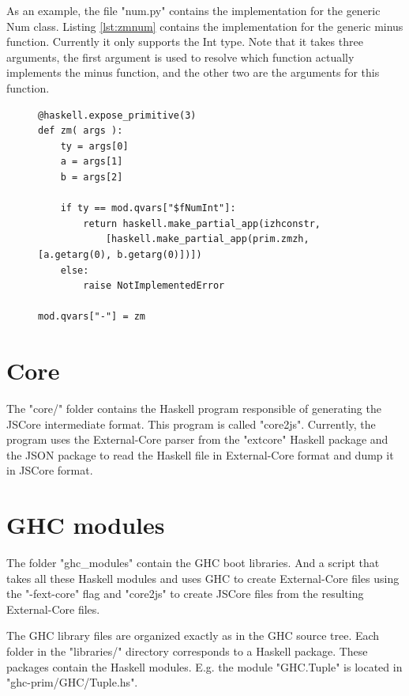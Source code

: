 As an example, the file "num.py" contains the implementation for the generic
Num class. Listing \ref{lst:zmnum} contains the implementation for the
generic minus function. Currently it only supports the Int type. Note that
it takes three arguments, the first argument is used to resolve which 
function actually implements the minus function, and the other two are the
arguments for this function.

\begin{figure}[H]
\lstset{ %
language=Python,
caption=Python class implementing the Haskell Int Value.,
label=lst:zmnum
}
\begin{lstlisting}
@haskell.expose_primitive(3)
def zm( args ):
    ty = args[0]
    a = args[1]
    b = args[2]

    if ty == mod.qvars["$fNumInt"]:
        return haskell.make_partial_app(izhconstr,
            [haskell.make_partial_app(prim.zmzh, [a.getarg(0), b.getarg(0)])])
    else:
        raise NotImplementedError

mod.qvars["-"] = zm
\end{lstlisting}
\end{figure}



\section{Core}

The "core/" folder contains the Haskell program responsible of generating the
JSCore intermediate format. This program is called "core2js". Currently, the
program uses the External-Core parser from the "extcore" Haskell package and
the JSON package to read the Haskell file in External-Core format and dump it
in JSCore format.

\section{GHC modules}

The folder "ghc\_modules" contain the GHC boot libraries. And a script that 
takes all these Haskell modules and uses GHC to create External-Core files
using the "-fext-core" flag and "core2js" to create JSCore files from the 
resulting External-Core files.

The GHC library files are organized exactly as in the GHC source tree. Each
folder in the "libraries/" directory corresponds to a Haskell package. These
packages contain the Haskell modules. E.g. the module "GHC.Tuple" is located
in "ghc-prim/GHC/Tuple.hs".

